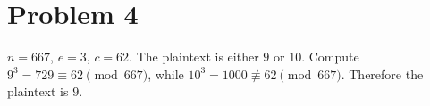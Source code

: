 \section*{Problem 4}

$n=667$, $e=3$, $c=62$. The plaintext is either $9$ or $10$.
Compute $9^3=729\equiv 62\pmod{667}$, while $10^3=1000\not\equiv 62\pmod{667}$.
Therefore the plaintext is $\boxed{9}$.
